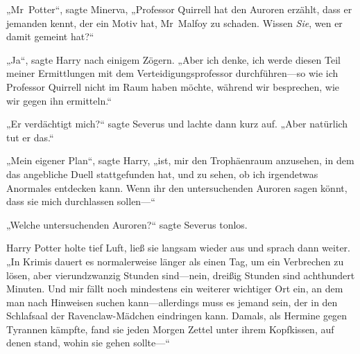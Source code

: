 „Mr~Potter“, sagte Minerva,
„Professor Quirrell hat den Auroren erzählt, dass er jemanden kennt, der ein Motiv hat, Mr~Malfoy zu schaden. Wissen \emph{Sie}, wen er damit gemeint hat?“

„Ja“, sagte Harry nach einigem Zögern.
„Aber ich denke, ich werde diesen Teil meiner Ermittlungen mit dem Verteidigungsprofessor durchführen—so wie ich Professor Quirrell nicht im Raum haben möchte, während wir besprechen, wie wir gegen ihn ermitteln.“

„Er verdächtigt mich?“ sagte Severus und lachte dann kurz auf.
„Aber natürlich tut er das.“

„Mein eigener Plan“, sagte Harry, „ist, mir den Trophäenraum anzusehen, in dem das angebliche Duell stattgefunden hat, und zu sehen, ob ich irgendetwas Anormales entdecken kann. Wenn ihr den untersuchenden Auroren sagen könnt, dass sie mich durchlassen sollen—“

„Welche untersuchenden Auroren?“ sagte Severus tonlos.

Harry Potter holte tief Luft, ließ sie langsam wieder aus und sprach dann weiter.
„In Krimis dauert es normalerweise länger als einen Tag, um ein Verbrechen zu lösen, aber vierundzwanzig Stunden sind—nein, dreißig Stunden sind achthundert Minuten. Und mir fällt noch mindestens ein weiterer wichtiger Ort ein, an dem man nach Hinweisen suchen kann—allerdings muss es jemand sein, der in den Schlafsaal der Ravenclaw-Mädchen eindringen kann. Damals, als Hermine gegen Tyrannen kämpfte, fand sie jeden Morgen Zettel unter ihrem Kopfkissen, auf denen stand, wohin sie gehen sollte—“

